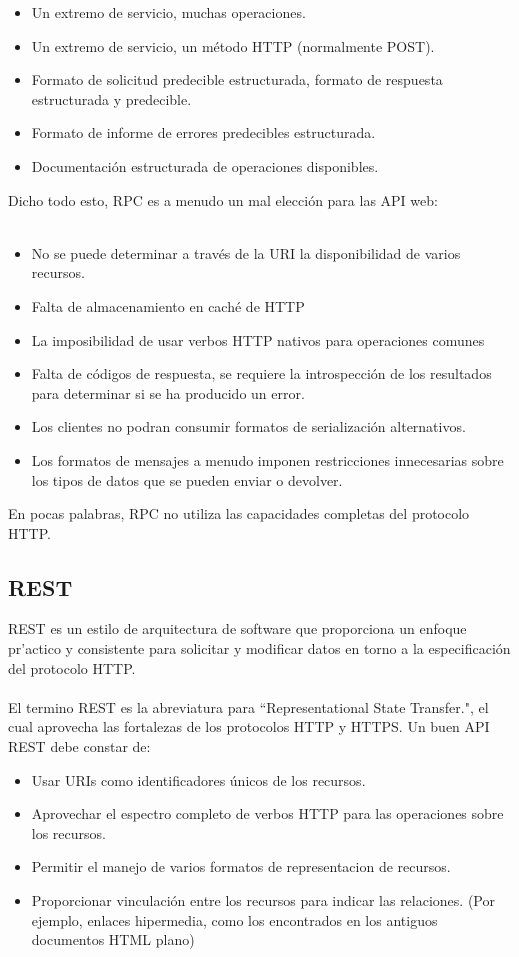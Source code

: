 \begin{itemize}
\item Un extremo de servicio, muchas operaciones.
\item Un extremo de servicio, un método HTTP (normalmente POST).
\item Formato de solicitud predecible estructurada, formato de respuesta estructurada y predecible.
\item Formato de informe de errores predecibles estructurada.
\item Documentación estructurada de operaciones disponibles.
\end{itemize}

Dicho todo esto, RPC es a menudo un mal elección para las API web:\\
\\
\begin{itemize}
\item No se puede determinar a través de la URI la disponibilidad de varios recursos.
\item Falta de almacenamiento en caché de HTTP
\item La imposibilidad de usar verbos HTTP nativos para operaciones comunes 
\item Falta de códigos de respuesta, se requiere la introspección de los resultados para determinar si se ha producido un error.
\item Los clientes no podran consumir formatos de serialización alternativos.
\item Los formatos de mensajes a menudo imponen restricciones innecesarias sobre los tipos de datos que se pueden enviar o devolver.
\end{itemize}

En pocas palabras, RPC no utiliza las capacidades completas del protocolo HTTP.

\subsection{REST}
REST es un estilo de arquitectura de software que proporciona un enfoque pr'actico y consistente para solicitar y modificar datos en torno a la especificación del protocolo HTTP. \\
\\
El termino REST es la abreviatura para ``Representational State Transfer.", el cual aprovecha las fortalezas de los protocolos HTTP y HTTPS. Un buen API REST debe constar de:
\begin{itemize}
\item Usar URIs como identificadores únicos de los recursos.
\item Aprovechar el espectro completo de verbos HTTP para las operaciones sobre los recursos.
\item Permitir el manejo de varios formatos de representacion de recursos.
\item Proporcionar vinculación entre los recursos para indicar las relaciones. (Por ejemplo, enlaces hipermedia, como los encontrados en los antiguos documentos HTML plano)
\end{itemize}

